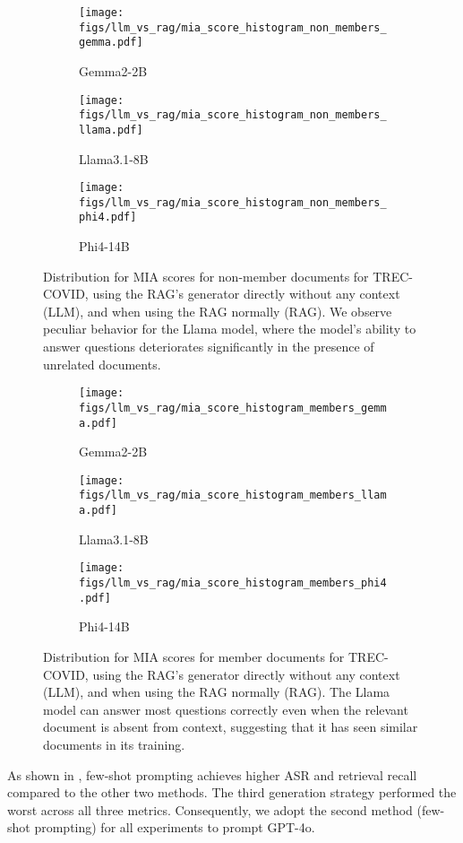 \begin{figure*}[h]
    \centering
    \begin{subfigure}[t]{0.32\textwidth}
        \centering
        \texttt{[image: figs/llm\_vs\_rag/mia\_score\_histogram\_non\_members\_gemma.pdf]}
        \caption{Gemma2-2B}
    \end{subfigure}
    \begin{subfigure}[t]{0.32\textwidth}
        \centering
        \texttt{[image: figs/llm\_vs\_rag/mia\_score\_histogram\_non\_members\_llama.pdf]}
        \caption{Llama3.1-8B}
    \end{subfigure}
    \begin{subfigure}[t]{0.32\textwidth}
        \centering
        \texttt{[image: figs/llm\_vs\_rag/mia\_score\_histogram\_non\_members\_phi4.pdf]}
        \caption{Phi4-14B}
    \end{subfigure}
    \caption{Distribution for MIA scores for non-member documents for TREC-COVID, using the RAG's generator directly without any context (LLM), and when using the RAG normally (RAG). We observe peculiar behavior for the Llama model, where the model's ability to answer questions deteriorates significantly in the presence of unrelated documents.}
    \label{fig:llm_vs_rag_nonmember}
\end{figure*}

\begin{figure*}[h]
    \centering
    \begin{subfigure}[t]{0.32\textwidth}
        \centering
        \texttt{[image: figs/llm\_vs\_rag/mia\_score\_histogram\_members\_gemma.pdf]}
        \caption{Gemma2-2B}
    \end{subfigure}
    \begin{subfigure}[t]{0.32\textwidth}
        \centering
        \texttt{[image: figs/llm\_vs\_rag/mia\_score\_histogram\_members\_llama.pdf]}
        \caption{Llama3.1-8B}
    \end{subfigure}
    \begin{subfigure}[t]{0.32\textwidth}
        \centering
        \texttt{[image: figs/llm\_vs\_rag/mia\_score\_histogram\_members\_phi4.pdf]}
        \caption{Phi4-14B}
    \end{subfigure}
    \caption{Distribution for MIA scores for member documents for TREC-COVID, using the RAG's generator directly without any context (LLM), and when using the RAG normally (RAG). The Llama model can answer most questions correctly even when the relevant document is absent from context, suggesting that it has seen similar documents in its training.}
    \label{fig:llm_vs_rag_member}
\end{figure*}

As shown in , few-shot prompting achieves higher ASR and retrieval recall compared to the other two methods. The third generation strategy performed the worst across all three metrics. Consequently, we adopt the second method (few-shot prompting) for all experiments to prompt GPT-4o. 
